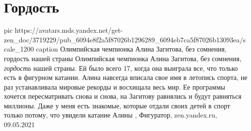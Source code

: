  
 
 
 
 
\chapter{Гордость}

\ifcmt
  pic https://avatars.mds.yandex.net/get-zen_doc/3719229/pub_6094e8f2a5f87026b1296289_6094eb7ca5f87026b13093ea/scale_1200
	caption Олимпийская чемпионка Алина Загитова, без сомнения, гордость нашей страны
\fi
Олимпийская чемпионка Алина Загитова, без сомнения, \emph{гордость} нашей страны. Ей
было всего 17, когда она выиграла все, что только есть в фигурном катании.
Алина навсегда вписала свое имя в летопись спорта, не раз устанавливала мировые
рекорды и восхищала весь мир. Ее программы хочется пересматривать снова и
снова, на Загитову равнялись и будут равняться миллионы. Даже у меня есть
знакомые, которые отдали своих детей в спорт только потому, что увидели катание
Алины
, 
Фигуратор, zen.yandex.ru, 09.05.2021

